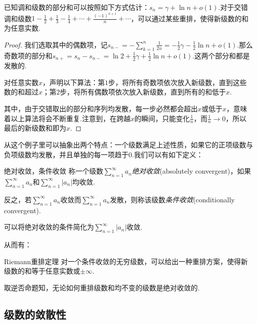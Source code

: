 \begin{example}
	已知调和级数的部分和可以按照如下方式估计：$s_n=\gamma + \ln n + o(1)$.对于交错调和级数$1-\frac{1}{2}+\frac{1}{3}-\frac{1}{4}+\cdots + \frac{(-1)^{n+1}}{n}+\cdots $，可以通过某些重排，使得新级数的和为任意实数.
\end{example}
\begin{proof}
	我们选取其中的偶数项，记$s_{n-}=-\sum_{k=1}^{n} \frac{1}{2n} = -\frac{1}{2}\gamma -\frac{1}{2}\ln n+o(1)$.那么奇数项的部分和$s_{n+}=s_n-s_{n-}=\ln 2+\frac{1}{2}\gamma + \frac{1}{2}\ln n + o(1)$.这两个部分和都是发散的.
	
	对任意实数$x$，声明以下算法：第$1$步，将所有奇数项依次放入新级数，直到这些数的和超过$x$；第$2$步，将所有偶数项依次放入新级数，直到所有的和低于$x$.
	
	其中，由于交错取出的部分和序列均发散，每一步必然都会超出$x$或低于$x$，意味着以上算法将会不断重复.注意到，在跨越$x$的瞬间，只能变化$\frac{1}{n}$，而$\frac{1}{n} \to 0$，所以最后的新级数和即为$x$.
\end{proof}

从这个例子里可以抽象出两个特点：一个级数满足上述性质，如果它的正项级数与负项级数均发散，并且单独的每一项趋于$0$.我们可以有如下定义：

\begin{definition}{绝对收敛，条件收敛}
	称一个级数$\sum_{n=1}^{\infty} a_n$\textit{绝对收敛}(absolutely convergent)，如果$\sum_{n=1}^{\infty} a_n$和$\sum_{n=1}^{\infty} |a_n|$均收敛.
	
	反之，若$\sum_{n=1}^{\infty} a_n$收敛而$\sum_{n=1}^{\infty} a_n$发散，则称该级数\textit{条件收敛}(conditionally convergent).
\end{definition}
\begin{remark}
	可以将绝对收敛的条件简化为$\sum_{n=1}^{\infty} |a_n|$收敛.
\end{remark}

从而有：

\begin{theorem}{Riemann重排定理}
	对一个条件收敛的无穷级数，可以给出一种重排方案，使得新级数的和等于任意实数或$\pm \infty$.
\end{theorem}
\begin{remark}
	取逆否命题知，无论如何重排级数和均不变的级数是绝对收敛的.
\end{remark}

\subsection{级数的敛散性}

